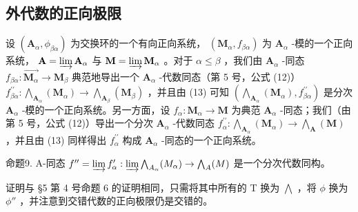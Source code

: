 \subsection{外代数的正向极限}

设 \((\mathbf{A}_{\alpha},\phi_{\beta \alpha})\) 为交换环的一个有向正向系统， \((\mathbf{M}_{\alpha},f_{\beta \alpha})\) 为 \(\mathbf{A}_{\alpha}\) -模的一个正向系统， \(\mathbf{A} = \varinjlim \mathbf{A}_{\alpha}\) 与 \(\mathbf{M} = \varinjlim \mathbf{M}_{\alpha}\) 。对于 \(\alpha \leqslant \beta\) ，我们由 \(\mathbf{A}_{\alpha}\) -同态 \(f_{\beta \alpha}: \overrightarrow{\mathbf{M}_{\alpha}} \to \mathbf{M}_{\beta}\) 典范地导出一个 \(\mathbf{A}_{\alpha}\) -代数同态（第 5 号，公式 (12)） \(f_{\beta \alpha}^{\prime \prime}: \bigwedge_{\mathbf{A}_{\alpha}} (\mathbf{M}_{\alpha}) \to \bigwedge_{\mathbf{A}_{\beta}} (\mathbf{M}_{\beta})\) ，并且由 (13) 可知 \((\bigwedge_{\mathbf{A}_{\alpha}} (\mathbf{M}_{\alpha}), f_{\beta \alpha}^{\prime \prime})\) 是分次 \(\mathbf{A}_{\alpha}\) -模的一个正向系统。另一方面，设 \(f_{\alpha}: \mathbf{M}_{\alpha} \to \mathbf{M}\) 为典范 \(\mathbf{A}_{\alpha}\) -同态；我们（由第 5 号，公式 (12)）导出一个分次 \(\mathbf{A}_{\alpha}\) -代数同态 \(f_{\alpha}^{\prime \prime}: \bigwedge_{\mathbf{A}_{\alpha}} (\mathbf{M}_{\alpha}) \to \bigwedge_{\mathbf{A}} (\mathbf{M})\) ，并且由 (13) 同样得出 \(f_{\alpha}^{\prime \prime}\) 构成 \(\mathbf{A}_{\alpha}\) -同态的一个正向系统。

命题9. A-同态 \(f'' = \varinjlim f_{\alpha}' : \varinjlim \bigwedge_{A_{\alpha}}(M_{\alpha}) \to \bigwedge_{A}(M)\) 是一个分次代数同构。

证明与 §5 第 4 号命题 6 的证明相同，只需将其中所有的 T 换为 \(\bigwedge\) ，将 \(\phi\) 换为 \(\phi''\) ，并注意到交错代数的正向极限仍是交错的。

